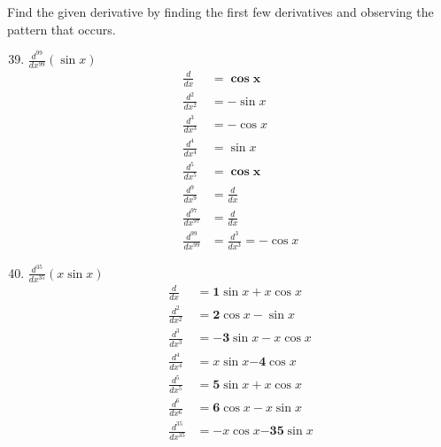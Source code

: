\documentclass{article}
\begin{document}
Find the given derivative by finding the first few derivatives and observing the pattern that occurs.
\begin{center}
\begin{minipage}[t]{0.49\linewidth}
	\begin{enumerate}
\setcounter{enumi}{38}
	\item $\frac{d^{99}}{dx^{99}}(\sin x)$
		$$\begin{align}
			\frac{d}{dx} &= \boldsymbol{\cos x}\\
			\frac{d^2}{dx^2} &= -\sin x\\
			\frac{d^3}{dx^3} &= -\cos x\\
			\frac{d^4}{dx^4} &= \sin x\\
			\frac{d^5}{dx^5} &= \boldsymbol{\cos x}\\
			\frac{d^9}{dx^9} &= \frac{d}{dx}\\
			\frac{d^{97}}{dx^{97}} &= \frac{d}{dx}\\
			\frac{d^{99}}{dx^{99}} &= \frac{d^3}{dx^3} = \boxed{-\cos x}
		\end{align}$$
\end{enumerate}
\end{minipage}
\begin{minipage}[t]{0.49\linewidth}
\begin{enumerate}
\setcounter{enumi}{39}
	\item $\frac{d^{35}}{dx^{35}}(x\sin x)$
	$$\begin{align}
		\frac{d}{dx}&= \boldsymbol{1}\sin x + x \cos x\\
		\frac{d^2}{dx^2} &= \boldsymbol{2}\cos x - \sin x\\
		\frac{d^3}{dx^3} &= \boldsymbol{-3}\sin x - x \cos x \\
		\frac{d^4}{dx^4} &= x\sin x \boldsymbol{- 4} \cos x\\
		\frac{d^5}{dx^5} &= \boldsymbol{5}\sin x + x \cos x\\
		\frac{d^6}{dx^6} &= \boldsymbol{6}\cos x - x \sin x\\
		\frac{d^{35}}{dx^{35}} &= \boxed{-x \cos x \boldsymbol{-35}\sin x}
	\end{align}$$
\end{enumerate}
\end{minipage}
\end{center}
\end{document}
